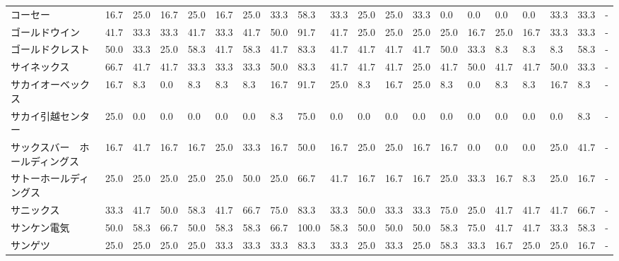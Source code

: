 \documentclass[a4paper，11pt]{jsarticle}
\begin{document}
\begin{longtable}[c]{lp{3mm}p{3mm}p{3mm}p{3mm}p{3mm}p{3mm}p{3mm}p{3mm}p{3mm}p{3mm}p{3mm}p{3mm}p{3mm}p{3mm}p{3mm}p{3mm}p{3mm}p{3mm}p{3mm}}
コーセー            &   16.7 &   25.0 &      16.7 &      25.0 &       16.7 &   25.0 &   33.3 &   58.3 &    33.3 &    25.0 &   25.0 &  33.3 &    0.0 &     0.0 &     0.0 &   0.0 &  33.3 &  33.3 &     - \\
ゴールドウイン         &   41.7 &   33.3 &      33.3 &      41.7 &       33.3 &   41.7 &   50.0 &   91.7 &    41.7 &    25.0 &   25.0 &  25.0 &   25.0 &    16.7 &    25.0 &  16.7 &  33.3 &  33.3 &     - \\
ゴールドクレスト        &   50.0 &   33.3 &      25.0 &      58.3 &       41.7 &   58.3 &   41.7 &   83.3 &    41.7 &    41.7 &   41.7 &  41.7 &   50.0 &    33.3 &     8.3 &   8.3 &   8.3 &  58.3 &     - \\
サイネックス          &   66.7 &   41.7 &      41.7 &      33.3 &       33.3 &   33.3 &   50.0 &   83.3 &    41.7 &    41.7 &   41.7 &  25.0 &   41.7 &    50.0 &    41.7 &  41.7 &  50.0 &  33.3 &     - \\
サカイオーベックス       &   16.7 &    8.3 &       0.0 &       8.3 &        8.3 &    8.3 &   16.7 &   91.7 &    25.0 &     8.3 &   16.7 &  25.0 &    8.3 &     0.0 &     8.3 &   8.3 &  16.7 &   8.3 &     - \\
サカイ引越センター       &   25.0 &    0.0 &       0.0 &       0.0 &        0.0 &    0.0 &    8.3 &   75.0 &     0.0 &     0.0 &    0.0 &   0.0 &    0.0 &     0.0 &     0.0 &   0.0 &   0.0 &   8.3 &     - \\
サックスバー　ホールディングス &   16.7 &   41.7 &      16.7 &      16.7 &       25.0 &   33.3 &   16.7 &   50.0 &    16.7 &    25.0 &   25.0 &  16.7 &   16.7 &     0.0 &     0.0 &   0.0 &  25.0 &  41.7 &     - \\
サトーホールディングス     &   25.0 &   25.0 &      25.0 &      25.0 &       25.0 &   50.0 &   25.0 &   66.7 &    41.7 &    16.7 &   16.7 &  16.7 &   25.0 &    33.3 &    16.7 &   8.3 &  25.0 &  16.7 &     - \\
サニックス           &   33.3 &   41.7 &      50.0 &      58.3 &       41.7 &   66.7 &   75.0 &   83.3 &    33.3 &    50.0 &   33.3 &  33.3 &   75.0 &    25.0 &    41.7 &  41.7 &  41.7 &  66.7 &     - \\
サンケン電気          &   50.0 &   58.3 &      66.7 &      50.0 &       58.3 &   58.3 &   66.7 &  100.0 &    58.3 &    50.0 &   50.0 &  50.0 &   58.3 &    75.0 &    41.7 &  41.7 &  33.3 &  58.3 &     - \\
サンゲツ            &   25.0 &   25.0 &      25.0 &      25.0 &       33.3 &   33.3 &   33.3 &   83.3 &    33.3 &    25.0 &   33.3 &  25.0 &   58.3 &    33.3 &    16.7 &  25.0 &  25.0 &  16.7 &     - \\

\end{longtable}
\end{document}
